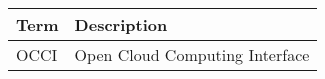 \begin{tabular}{l|l}
Term & Description \\
\hline
OCCI & Open Cloud Computing Interface \\
\end{tabular}
